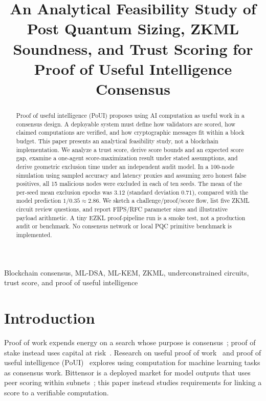 \documentclass[conference]{IEEEtran}
\title{An Analytical Feasibility Study of Post Quantum Sizing, ZKML Soundness, and Trust Scoring for Proof of Useful Intelligence Consensus}
\author{
\IEEEauthorblockN{Md.\ Mehedi Hasan, Asraful Islam Sharthak, Prof.\ Dr.\ Md.\ Abdul Based}
\IEEEauthorblockA{\textit{Dhaka International University}\\
Dhaka, Bangladesh}

}
\begin{document}
\maketitle

\begin{abstract}

Proof of useful intelligence (PoUI) proposes using AI computation as useful work in a consensus design. A deployable system must define how validators are scored, how claimed computations are verified, and how cryptographic messages fit within a block budget. This paper presents an analytical feasibility study, not a blockchain implementation. We analyze a trust score, derive score bounds and an expected score gap, examine a one-agent score-maximization result under stated assumptions, and derive geometric exclusion time under an independent audit model. In a 100-node simulation using sampled accuracy and latency proxies and assuming zero honest false positives, all 15 malicious nodes were excluded in each of ten seeds. The mean of the per-seed mean exclusion epochs was $3.12$ (standard deviation $0.71$), compared with the model prediction $1/0.35\approx2.86$. We sketch a challenge/proof/score flow, list five ZKML circuit review questions, and report FIPS/RFC parameter sizes and illustrative payload arithmetic. A tiny EZKL proof-pipeline run is a smoke test, not a production audit or benchmark. No consensus network or local PQC primitive benchmark is implemented.
\end{abstract}

\begin{IEEEkeywords}
Blockchain consensus, ML-DSA, ML-KEM, ZKML, underconstrained circuits, trust score, and proof of useful intelligence
\end{IEEEkeywords}

\section{Introduction}
\label{sec:intro}

Proof of work expends energy on a search whose purpose is consensus~\cite{nakamoto2008}; proof of stake instead uses capital at risk~\cite{saleh2021pos}. Research on useful proof of work~\cite{lihu2020pouw,baldominos2019coinai} and proof of useful intelligence (PoUI)~\cite{chong2025poui} explores using computation for machine learning tasks as consensus work. Bittensor is a deployed market for model outputs that uses peer scoring within subnets~\cite{bittensor2024}; this paper instead studies requirements for linking a score to a verifiable computation.
\end{document}
